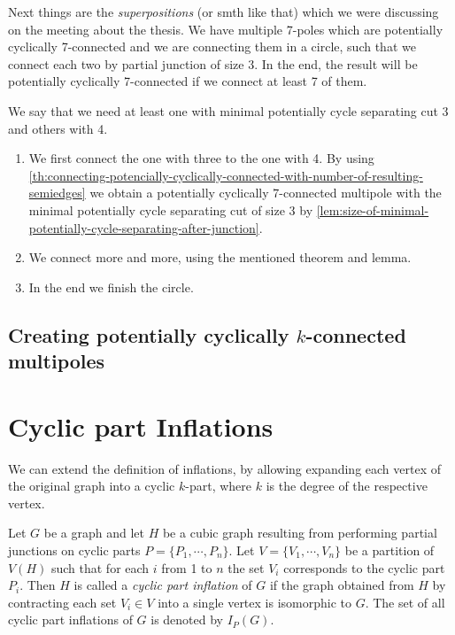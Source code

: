 \documentclass[12pt, twoside]{book}
\begin{document}
Next things are the \textit{superpositions} (or smth like that) which we were discussing on the meeting about the thesis. We have multiple 7-poles which are potentially cyclically 7-connected and we are connecting them in a circle, such that we connect each two by partial junction of size 3. In the end, the result will be potentially cyclically 7-connected if we connect at least 7 of them.

We say that we need at least one with minimal potentially cycle separating cut 3 and others with 4.

\begin{enumerate}
	\item We first connect the one with three to the one with 4. By using \cref{th:connecting-potencially-cyclically-connected-with-number-of-resulting-semiedges} we obtain a potentially cyclically 7-connected multipole with the minimal potentially cycle separating cut of size 3 by \cref{lem:size-of-minimal-potentially-cycle-separating-after-junction}.
	\item We connect more and more, using the mentioned theorem and lemma.
	\item In the end we finish the circle. 
\end{enumerate}

\section{Creating potentially cyclically $k$-connected multipoles}

\todo{}

\chapter{Cyclic part Inflations}

We can extend the definition of inflations, by allowing expanding each vertex of the original graph into a cyclic $k$-part, where $k$ is the degree of the respective vertex.


\begin{definition}
	\label{def:cyclic-part-inflation}
	Let $G$ be a graph and let $H$ be a cubic graph resulting from performing partial junctions on cyclic parts $P=\{P_1,\cdots,P_n\}$. Let $V=\{V_1,\cdots, V_n\}$ be a partition of $V(H)$ such that for each $i$ from 1 to $n$ the set $V_i$ corresponds to the cyclic part $P_i$. Then $H$ is called a \textit{cyclic part inflation} of $G$ if the graph obtained from $H$ by contracting each set $V_i\in V$ into a single vertex is isomorphic to $G$. The set of all cyclic part inflations of $G$ is denoted by $I_P(G)$.
\end{definition}
\end{document}
